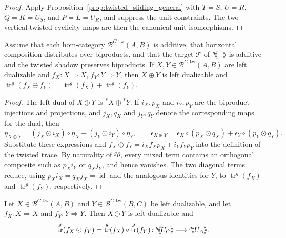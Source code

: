\documentclass[11pt,oneside]{amsart}
\DeclareMathOperator{\tr}{tr}
\DeclareMathOperator{\id}{id}
\numberwithin{equation}{section}
\numberwithin{figure}{section}
\theoremstyle{plain}
\theoremstyle{definition}
\theoremstyle{remark}
\newcommand{\shspace}{\hspace{.5mm}} %
\newcommand{\sh}[1]{{\ensuremath{\shspace\hspace{1mm}\makebox[-1mm]{$\langle$}\makebox[0mm]{$\langle$}\hspace{1mm}{#1}\makebox[1mm]{$\rangle$}\makebox[0mm]{$\rangle$}\shspace}}}
\begin{document}
\begin{proof}
Apply Proposition~\ref{prop:twisted_sliding_general} with
\(T=S\), \(U=R\), \(Q=K=U_S\), and \(P=L=U_R\), and suppress the
unit constraints.  The two vertical twisted cyclicity maps are then the
canonical unit isomorphisms.
\end{proof}

\begin{prop}\label{prop:tw-additivity}
Assume that each hom-category \(\mathcal B^{G\text{-tw}}(A,B)\) is
additive, that horizontal composition distributes over biproducts, and that
the target \(\mathcal T\) of \({}^g\!\sh{-}\) is additive and the twisted
shadow preserves biproducts.  If
\(X,Y\in\mathcal B^{G\text{-tw}}(A,B)\) are left dualizable and
\(f_X\colon X\Rightarrow X\), \(f_Y\colon Y\Rightarrow Y\), then
\(X\oplus Y\) is left dualizable and
\(
\tr^g(f_X\oplus f_Y)=\tr^g(f_X)+\tr^g(f_Y).
\)
\end{prop}

\begin{proof}
The left dual of \(X\oplus Y\) is \({}^*X\oplus{}^*Y\).  If
\(i_X,p_X\) and \(i_Y,p_Y\) are the biproduct injections and projections,
and \(j_X,q_X\) and \(j_Y,q_Y\) denote the corresponding maps for the
dual, then
\[
\bar\eta_{X\oplus Y}
=(j_X\odot i_X)\circ\bar\eta_X
 +(j_Y\odot i_Y)\circ\bar\eta_Y,
\qquad
\bar\epsilon_{X\oplus Y}
=\bar\epsilon_X\circ(p_X\odot q_X)
 +\bar\epsilon_Y\circ(p_Y\odot q_Y).
\]
Substitute these expressions and
\(f_X\oplus f_Y=i_Xf_Xp_X+i_Yf_Yp_Y\) into the definition of the
twisted trace.  By naturality of \({}^g\theta\), every mixed term contains
an orthogonal composite such as \(p_Xi_Y\) or \(q_Xj_Y\), and hence
vanishes.  The two diagonal terms reduce, using
\(p_Xi_X=q_Xj_X=\id\) and the analogous identities for \(Y\), to
\(\tr^g(f_X)\) and \(\tr^g(f_Y)\), respectively.
\end{proof}

\begin{prop}\label{prop:tw-multiplicativity}
Let
\(X\in\mathcal B^{G\text{-tw}}(A,B)\) and
\(Y\in\mathcal B^{G\text{-tw}}(B,C)\) be left dualizable, and let
\(f_X\colon X\Rightarrow X\) and \(f_Y\colon Y\Rightarrow Y\).  Then
\(X\odot Y\) is left dualizable and
\[
\tr^g(f_X\odot f_Y)
=\tr^g(f_X)\circ\tr^g(f_Y)
\colon{}^g\!\sh{U_C}\longrightarrow{}^g\!\sh{U_A}.
\]
\end{prop}
\end{document}
